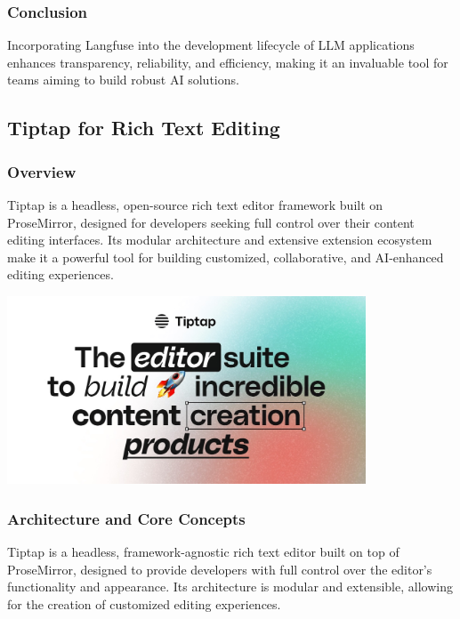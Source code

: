 \subsubsection{Conclusion}
Incorporating Langfuse into the development lifecycle of LLM applications enhances transparency, reliability, and efficiency, making it an invaluable tool for teams aiming to build robust AI solutions.

\subsection{Tiptap for Rich Text Editing}

\subsubsection{Overview}
Tiptap is a headless, open-source rich text editor framework built on ProseMirror, designed for developers seeking full control over their content editing interfaces. Its modular architecture and extensive extension ecosystem make it a powerful tool for building customized, collaborative, and AI-enhanced editing experiences.

\begin{center}
    \centering
    \includegraphics[width=0.8\textwidth]{Images/Tiptap editor.jpg}
     \cite{tiptap}
    \label{fig:tiptap}
\end{center}

\subsubsection{Architecture and Core Concepts}
Tiptap is a headless, framework-agnostic rich text editor built on top of ProseMirror, designed to provide developers with full control over the editor’s functionality and appearance. Its architecture is modular and extensible, allowing for the creation of customized editing experiences.

